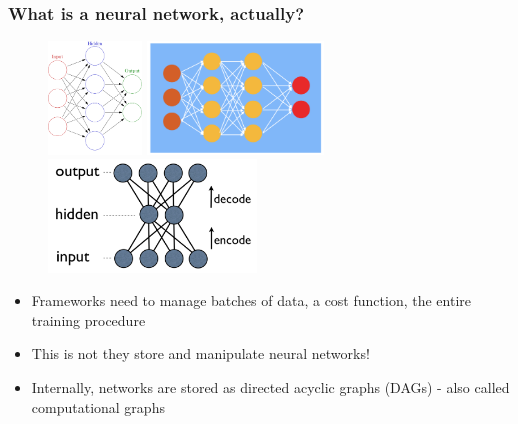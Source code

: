 \documentclass{Bredelebeamer}
\begin{document}
\begin{frame}
\frametitle{What is a neural network, actually?}
\begin{figure}[h!]
	\centering
        \includegraphics[height=3cm]{network_diagrams/small.png}
        \includegraphics[height=3cm]{network_diagrams/small2.png}
        \includegraphics[height=3cm]{autoencoder_bad_diagram.png}
\end{figure}
\pause
	\begin{itemize}[<+->]
		\item Frameworks need to manage batches of data, a cost function, the entire training procedure
		\item This is not they store and manipulate neural networks!
		\item Internally, networks are stored as directed acyclic graphs (DAGs) - also called computational graphs
	\end{itemize}
\begin{figure}[h!]
	\centering
\end{figure}
\end{frame}
\end{document}
